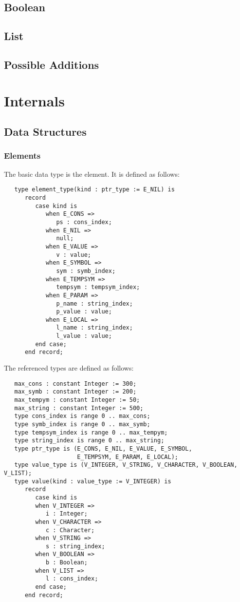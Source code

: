 \documentclass[10pt, openany]{book}
\begin{document}
\subsection{Boolean}
\subsection{List}
\subsection{Possible Additions}
\section{Internals}
\subsection{Data Structures}
\subsubsection{Elements}
The basic data type is the element.  It is defined as follows:
\lstset{language=Ada}
\begin{lstlisting}
   type element_type(kind : ptr_type := E_NIL) is
      record
         case kind is
            when E_CONS =>
               ps : cons_index;
            when E_NIL =>
               null;
            when E_VALUE =>
               v : value;
            when E_SYMBOL =>
               sym : symb_index;
            when E_TEMPSYM =>
               tempsym : tempsym_index;
            when E_PARAM =>
               p_name : string_index;
               p_value : value;
            when E_LOCAL =>
               l_name : string_index;
               l_value : value;
         end case;
      end record;
\end{lstlisting}
The referenced types are defined as follows:
\begin{lstlisting}
   max_cons : constant Integer := 300;
   max_symb : constant Integer := 200;
   max_tempym : constant Integer := 50;
   max_string : constant Integer := 500;
   type cons_index is range 0 .. max_cons;
   type symb_index is range 0 .. max_symb;
   type tempsym_index is range 0 .. max_tempym;
   type string_index is range 0 .. max_string;
   type ptr_type is (E_CONS, E_NIL, E_VALUE, E_SYMBOL,
                     E_TEMPSYM, E_PARAM, E_LOCAL);
   type value_type is (V_INTEGER, V_STRING, V_CHARACTER, V_BOOLEAN, V_LIST);
   type value(kind : value_type := V_INTEGER) is
      record
         case kind is
         when V_INTEGER =>
            i : Integer;
         when V_CHARACTER =>
            c : Character;
         when V_STRING =>
            s : string_index;
         when V_BOOLEAN =>
            b : Boolean;
         when V_LIST =>
            l : cons_index;
         end case;
      end record;

\end{lstlisting}
\end{document}
